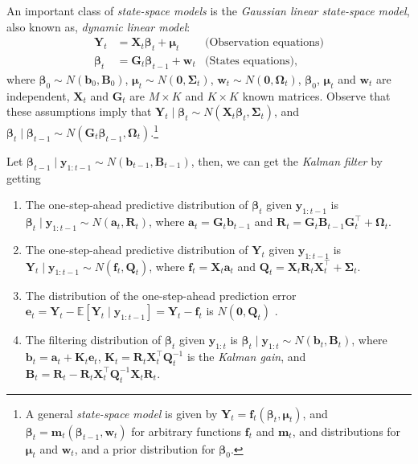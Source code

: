 An important class of \textit{state-space models} is the \textit{Gaussian linear state-space model}, also known as, \textit{dynamic linear model}:
\begin{align*}
	\bm{Y}_t&=\bm{X}_t\bm{\beta}_t+\bm{\mu}_t& \text{(Observation equations)}\\
	\bm{\beta}_t&=\bm{G}_t\bm{\beta}_{t-1}+\bm{w}_t & \text{(States equations)},
\end{align*}
where $\bm{\beta}_0\sim N(\bm{b}_0,\bm{B}_0)$, $\bm{\mu}_t\sim N(\bm{0}, \bm{\Sigma}_t)$, $\bm{w}_t\sim N(\bm{0}, \bm{\Omega}_t)$, $\bm{\beta}_0$, $\bm{\mu}_t$ and $\bm{w}_t$ are independent, $\bm{X}_t$ and $\bm{G}_t$ are $M\times K$ and $K\times K$ known matrices. Observe that these assumptions imply that $\bm{Y}_t\mid \bm{\beta}_t\sim N(\bm{X}_t\bm{\beta}_t,\bm{\Sigma}_t)$, and $\bm{\beta}_t\mid \bm{\beta}_{t-1}\sim N(\bm{G}_t\bm{\beta}_{t-1},\bm{\Omega}_t)$.\footnote{A general \textit{state-space model} is given by $\bm{Y}_t=\bm{f}_t(\bm{\beta}_t,\bm{\mu}_t)$, and $\bm{\beta}_t=\bm{m}_t(\bm{\beta}_{t-1},\bm{w}_t)$ for arbitrary functions $\bm{f}_t$ and $\bm{m}_t$, and distributions for $\bm{\mu}_t$ and $\bm{w}_t$, and a prior distribution for $\bm{\beta}_0$.}

Let $\bm{\beta}_{t-1}\mid \bm{y}_{1:t-1}\sim N(\bm{b}_{t-1},\bm{B}_{t-1})$, then, we can get the \textit{Kalman filter} by getting
\begin{enumerate}
	\item The one-step-ahead predictive distribution of $\bm{\beta}_t$ given $\bm{y}_{1:t-1}$ is $\bm{\beta}_t\mid \bm{y}_{1:t-1}\sim N(\bm{a}_t, \bm{R}_t)$, where $\bm{a}_t=\bm{G}_t\bm{b}_{t-1}$ and $\bm{R}_t=\bm{G}_t\bm{B}_{t-1}\bm{G}_t^{\top}+\bm{\Omega}_t$.
	\item  The one-step-ahead predictive distribution of $\bm{Y}_t$ given $\bm{y}_{1:t-1}$ is $\bm{Y}_t\mid \bm{y}_{1:t-1}\sim N(\bm{f}_t, \bm{Q}_t)$, where $\bm{f}_t=\bm{X}_t\bm{a}_t$ and $\bm{Q}_t=\bm{X}_t\bm{R}_t\bm{X}_t^{\top}+\bm{\Sigma}_t$.
	\item The distribution of the one-step-ahead prediction error  $\bm{e}_t=\bm{Y}_t-\mathbb{E}[\bm{Y}_t\mid \bm{y}_{1:t-1}]=\bm{Y}_t-\bm{f}_t$ is $N(\bm{0}, \bm{Q}_t)$ \cite[Chap.~6]{shumway2017time}. 
	\item The filtering distribution of $\bm{\beta}_t$ given $\bm{y}_{1:t}$ is $\bm{\beta}_t\mid \bm{y}_{1:t}\sim N(\bm{b}_t, \bm{B}_t)$, where $\bm{b}_t=\bm{a}_t+\bm{K}_t\bm{e}_t$, $\bm{K}_t=\bm{R}_t\bm{X}_t^{\top}\bm{Q}_t^{-1}$ is the \textit{Kalman gain}, and $\bm{B}_t=\bm{R}_t-\bm{R}_t\bm{X}_t^{\top}\bm{Q}_t^{-1}\bm{X}_t\bm{R}_t$.   
\end{enumerate}    

